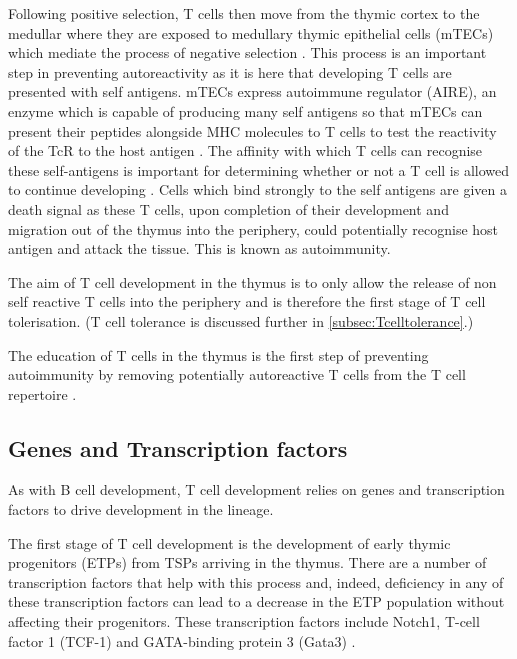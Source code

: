 Following positive selection, T cells then move from the thymic cortex to the medullar where they are exposed to medullary thymic epithelial cells (mTECs) which mediate the process of negative selection \citep{Starr2003}.
This process is an important step in preventing autoreactivity as it is here that developing T cells are presented with self antigens.
mTECs express autoimmune regulator (AIRE), an enzyme which is capable of producing many self antigens so that mTECs can present their peptides alongside MHC molecules to T cells to test the reactivity of the TcR to the host antigen \citep{Anderson2011}.
The affinity with which T cells can recognise these self-antigens is important for determining whether or not a T cell is allowed to continue developing \citep{Ashton1994}.
Cells which bind strongly to the self antigens are given a death signal as these T cells, upon completion of their development and migration out of the thymus into the periphery, could potentially recognise host antigen and attack the tissue.
This is known as autoimmunity.

The aim of T cell development in the thymus is to only allow the release of non self reactive T cells into the periphery and is therefore the first stage of T cell tolerisation. 
(T cell tolerance is discussed further in \cref{subsec:Tcelltolerance}.)

The education of T cells in the thymus is the first step of preventing autoimmunity by removing potentially autoreactive T cells from the T cell repertoire \citep{Walker2002}.

\subsection{Genes and Transcription factors}
\label{subsec:Tcellgenes}

As with B cell development, T cell development relies on genes and transcription factors to drive development in the lineage.

The first stage of T cell development is the development of early thymic progenitors (ETPs) from TSPs arriving in the thymus.
There are a number of transcription factors that help with this process and, indeed, deficiency in any of these transcription factors can lead to a decrease in the ETP population without affecting their progenitors.
These transcription factors include Notch1, T-cell factor 1 (TCF-1) and GATA-binding protein 3 (Gata3) \citep{Sambandam2005, Naito2011, Weber2011, Hosoya2009}.

